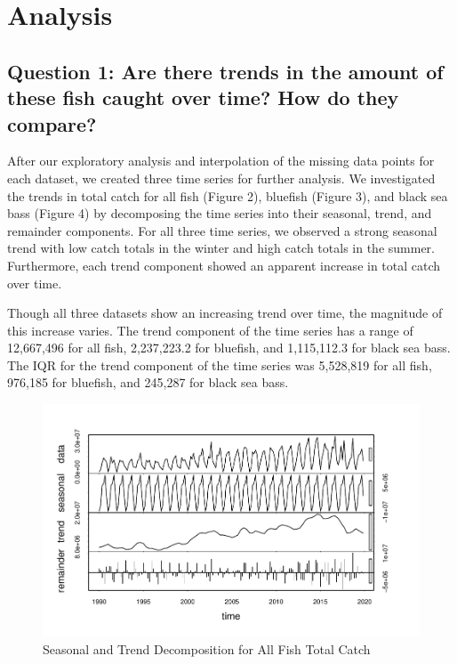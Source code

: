 \documentclass[
  12pt,
]{article}
\begin{document}
\newpage

\hypertarget{analysis}{%
\section{Analysis}\label{analysis}}

\hypertarget{question-1-are-there-trends-in-the-amount-of-these-fish-caught-over-time-how-do-they-compare}{%
\subsection{Question 1: Are there trends in the amount of these fish
caught over time? How do they
compare?}\label{question-1-are-there-trends-in-the-amount-of-these-fish-caught-over-time-how-do-they-compare}}

After our exploratory analysis and interpolation of the missing data
points for each dataset, we created three time series for further
analysis. We investigated the trends in total catch for all fish (Figure
2), bluefish (Figure 3), and black sea bass (Figure 4) by decomposing
the time series into their seasonal, trend, and remainder components.
For all three time series, we observed a strong seasonal trend with low
catch totals in the winter and high catch totals in the summer.
Furthermore, each trend component showed an apparent increase in total
catch over time.

Though all three datasets show an increasing trend over time, the
magnitude of this increase varies. The trend component of the time
series has a range of 12,667,496 for all fish, 2,237,223.2 for bluefish,
and 1,115,112.3 for black sea bass. The IQR for the trend component of
the time series was 5,528,819 for all fish, 976,185 for bluefish, and
245,287 for black sea bass.

\begin{figure}[H]

\hfill{}\includegraphics{Report_FishTrends_files/figure-latex/All Fish Trends-1} 

\caption{Seasonal and Trend Decomposition for All Fish Total Catch}\label{fig:All Fish Trends}
\end{figure}
\end{document}
